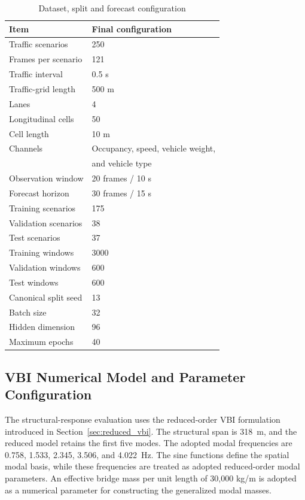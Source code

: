 \documentclass[journal]{IEEEtran}
\begin{document}
\begin{table}[!htbp]
\centering
\caption{Dataset, split and forecast configuration}
\label{tab:dataset_configuration}
\footnotesize
\begin{tabular}{ll}
\toprule
\textbf{Item} & \textbf{Final configuration} \\
\midrule
Traffic scenarios       & 250 \\
Frames per scenario     & 121 \\
Traffic interval        & 0.5 s \\
Traffic-grid length     & 500 m \\
Lanes                   & 4 \\
Longitudinal cells      & 50 \\
Cell length             & 10 m \\
Channels                & Occupancy, speed, vehicle weight, \\
                        & and vehicle type \\
Observation window      & 20 frames / 10 s \\
Forecast horizon        & 30 frames / 15 s \\
Training scenarios      & 175 \\
Validation scenarios    & 38 \\
Test scenarios          & 37 \\
Training windows        & 3000 \\
Validation windows      & 600 \\
Test windows            & 600 \\
Canonical split seed    & 13 \\
Batch size              & 32 \\
Hidden dimension        & 96 \\
Maximum epochs          & 40 \\
\bottomrule
\end{tabular}
\end{table}




\subsection{VBI Numerical Model and Parameter Configuration}
\label{sec:vbi_configuration}

The structural-response
evaluation uses the reduced-order VBI formulation introduced in Section~\ref{sec:reduced_vbi}.
The structural span is 318~m, and the reduced model retains the first five modes. The adopted modal frequencies are 0.758, 1.533, 2.345, 3.506, and 4.022~Hz. The sine functions define the spatial modal basis, while these frequencies are treated as adopted reduced-order modal parameters. An effective bridge mass per unit length of 30,000 kg/m is
adopted as a numerical parameter for constructing the generalized modal masses.
\end{document}
